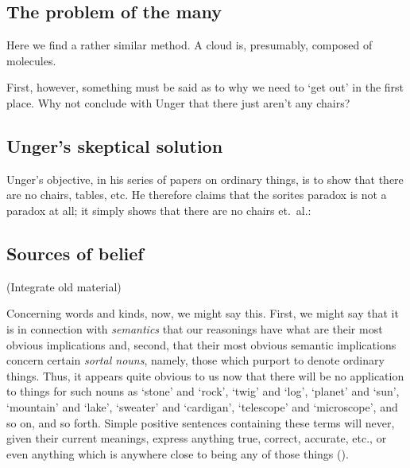 \documentclass[11pt]{article}
\newenvironment{squote}{%
       \begin{spacing}{1}
       \begin{list}{}{%
       \setlength{\labelwidth}{0pt}%
       \rightmargin\leftmargin%
       }
       \item\relax
       }{%
       \end{list}%
       \end{spacing}
}
\begin{document}
\begin{spacing}{1}
\subsection{The problem of the many}
Here we find a rather similar method.  A cloud is, presumably,
composed of molecules.

\hline

First, however, something must be said as to why we need to `get out'
in the first place.  Why not conclude with Unger that there just
aren't any chairs?

\subsection{Unger's skeptical solution}
Unger's objective, in his series of papers on ordinary things, is to
show that there are no chairs, tables, etc.  He therefore claims that
the sorites paradox is not a paradox at all; it simply shows that
there are no chairs et.\ al.:



\subsection{Sources of belief}
(Integrate old material)

\begin{squote}
Concerning words and kinds, now, we might say this.  First, we might
say that it is in connection with \emph{semantics} that our reasonings have
what are their most obvious implications and, second, that their most
obvious semantic implications concern certain \emph{sortal nouns}, namely,
those which purport to denote ordinary things.  Thus, it appears quite
obvious to us now that there will be no application to things for such
nouns as `stone' and `rock', `twig' and `log', `planet' and `sun',
`mountain' and `lake', `sweater' and `cardigan', `telescope' and
`microscope', and so on, and so forth.  Simple positive sentences
containing these terms will never, given their current meanings,
express anything true, correct, accurate, etc., or even anything which
is anywhere close to being any of those things
(\citeyear[148]{unger1979}).
\end{squote}


\end{spacing}
\end{document}
